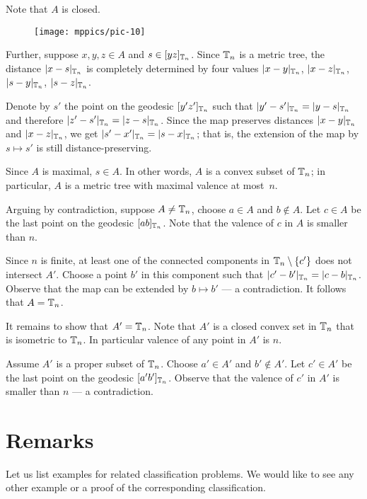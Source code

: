 \documentclass[a4paper,10pt]{article}
\begin{document}
Note that $A$ is closed.

\begin{wrapfigure}{o}{23 mm}
\vskip-6mm
\centering
\texttt{[image: mppics/pic-10]}
\end{wrapfigure}

Further, suppose $x,y,z\in A$ and $s\in [yz]_{\mathbb{T}_n}$.
Since $\mathbb{T}_n$ is a metric tree, the distance $|x-s|_{\mathbb{T}_n}$ is completely determined by four values $|x-y|_{\mathbb{T}_n}$, $|x-z|_{\mathbb{T}_n}$, $|s-y|_{\mathbb{T}_n}$, $|s-z|_{\mathbb{T}_n}$.

Denote by $s'$ the point on the geodesic $[y'z']_{\mathbb{T}_n}$ such that $|y'-s'|_{\TT_n}\z=|y-s|_{\TT_n}$ and therefore $|z'-s'|_{\mathbb{T}_n}=|z-s|_{\mathbb{T}_n}$.
Since the map preserves distances $|x-y|_{\mathbb{T}_n}$ and $|x-z|_{\mathbb{T}_n}$, we get $|s'-x'|_{\mathbb{T}_n}=|s-x|_{\mathbb{T}_n}$;
that is, the extension of the map by $s\mapsto s'$ is still distance-preserving.

Since $A$ is maximal, $s\in A$.
In other words, $A$ is a convex subset of $\mathbb{T}_n$;
in particular, $A$ is a metric tree with maximal valence at most~$n$.

Arguing by contradiction, suppose $A\ne \mathbb{T}_n$, choose $a\in A$ and $b\notin A$. 
Let $c\in A$ be the last point on the geodesic $[ab]_{\mathbb{T}_n}$.
Note that the valence of $c$ in $A$ is smaller than $n$.

Since $n$ is finite, at least one of the connected components in $\TT_n\z\setminus \{c'\}$ does not intersect $A'$.
Choose a point $b'$ in this component such that $|c'-b'|_{\mathbb{T}_n}=|c-b|_{\mathbb{T}_n}$.
Observe that the map can be extended by $b\mapsto b'$ --- a contradiction.
It follows that $A=\mathbb{T}_n$.

It remains to show that $A'=\mathbb{T}_n$.
Note that $A'$ is a closed convex set in $\mathbb{T}_n$ that is isometric to $\mathbb{T}_n$.
In particular valence of any point in $A'$ is $n$.

Assume $A'$ is a proper subset of $\mathbb{T}_n$.
Choose $a'\in A'$ and $b'\notin A'$.
Let $c'\in A'$ be the last point on the geodesic $[a'b']_{\mathbb{T}_n}$.
Observe that the valence of $c'$ in $A'$ is smaller than $n$ --- a contradiction.
\qeds

\section{Remarks}


Let us list examples for related classification problems.
We would like to see any other example or a proof of the corresponding classification. 
\end{document}
